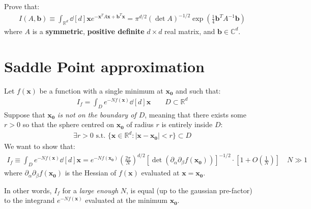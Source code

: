 \documentclass[../template.tex]{subfiles}
\begin{document}
\begin{exo}[Generalization]
    Prove that:
    \begin{align}\label{eqn:generalized-gauss-int}
        I(A,\bm{b}) \equiv \int_{\mathbb{R}^d} \dd[d]{\bm{x}} e^{-\bm{x}^T A \bm{x} + \bm{b}^T \bm{x}} = \pi^{d/2} (\operatorname{det}A)^{-1/2} \exp\left(\frac{1}{4} \bm{b}^T A^{-1} \bm{b} \right)
    \end{align}
    where $A$ is a \textbf{symmetric}, \textbf{positive definite} $d\times d$ real matrix, and $\bm{b} \in \mathbb{C}^d$.  
\end{exo}

\section{Saddle Point approximation}
Let $f(\bm{x})$ be a function with a single minimum at $\bm{x_0}$ and such that:
\begin{align}\label{eqn:If-def}
    I_f = \int_{D} e^{-N f(\bm{x})} \dd[d]{\bm{x}} \qquad D \subset \mathbb{R}^d
\end{align}
Suppose that $\bm{x_0}$ \textit{is not on the boundary of $D$}, meaning that there exists some $r > 0$ so that the sphere centred on $\bm{x_0}$ of radius $r$ is entirely inside $D$:
\begin{align*}
    \exists r > 0 \text{ s.t. }\{\bm{x} \in \mathbb{R}^d \colon |\bm{x}-\bm{x_0}| < r\} \subset D
\end{align*} 
We want to show that:
\begin{align}\label{eqn:saddle-point}
    I_f \equiv \int_D e^{-N f(\bm{x})} \dd[d]{\bm{x}} = e^{-N f(\bm{x_0})} \left(\frac{2\pi}{N} \right)^{d/2} [\operatorname{det}(\partial_\alpha\partial_\beta f(\bm{x_0})) ]^{-1/2} \cdot \left[1+O\left(\frac{1}{N} \right)\right] \quad N \gg 1
\end{align}
where $\partial_\alpha \partial_\beta f(\bm{x_0})$ is the Hessian of $f(\bm{x})$ evaluated at $\bm{x} = \bm{x_0}$.

In other words, $I_f$ for a \textit{large enough} $N$, is equal (up to the gaussian pre-factor) to the integrand $e^{-N f(\bm{x})}$ evaluated at the minimum $\bm{x_0}$.

\medskip
\end{document}
